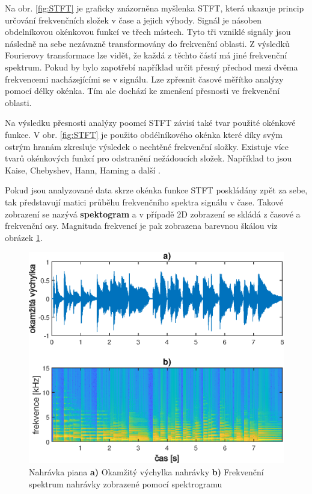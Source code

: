   Na obr. \ref{fig:STFT} je graficky znázorněna myšlenka \acs{STFT}, která ukazuje princip určování frekvenčních složek v čase a jejich výhody. 
  Signál je násoben obdelníkovou okénkovou funkcí ve třech místech.
  Tyto tři vzniklé signály jsou následně na sebe nezávazně transformovány do frekvenční oblasti.
  Z výsledků Fourierovy transformace lze vidět, že každá z těchto částí má jiné frekvenční spektrum.
  Pokud by bylo zapotřebí například určit přesný přechod mezi dvěma frekvencemi nacházejícími se v signálu. Lze zpřesnit časové měřítko analýzy pomocí délky okénka.
  Tím ale dochází ke zmenšení přesnosti ve frekvenční oblasti.
  
  Na výsledku přesnosti analýzy poomcí \acs{STFT} závisí také tvar použité okénkové funkce.
  V obr. \ref{fig:STFT} je použito obdélníkového okénka které díky svým ostrým hranám zkresluje výsledek o nechtěné frekvenční složky.
  Existuje více tvarů okénkových funkcí pro odstranění nežádoucích složek.
  Například to jsou Kaise, Chebyshev, Hann, Haming a další \cite{Time-frequency_distributions}.
  
  Pokud jsou analyzované data skrze okénka funkce \acs{STFT} poskládány zpět za sebe, tak představují matici průběhu frekvenčního spektra signálu v čase.
  Takové zobrazení se nazývá \textbf{spektogram} a v případě 2D zobrazení se skládá z časové a frekvenční osy.
  Magnituda frekvencí je pak zobrazena barevnou škálou viz obrázek \ref{fig:Spectrogram}.

  \begin{figure}[H]
    \centering
    \includegraphics[width = 0.8\linewidth]{obrazky/Spectrogam.eps}
    \caption{Nahrávka piana \textbf{a)} Okamžitý výchylka nahrávky \textbf{b)} Frekvenční spektrum nahrávky zobrazené pomocí spektrogramu}
    \label{fig:Spectrogram}
  \end{figure}

